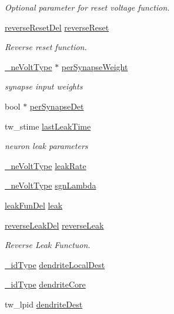 \begin{DoxyCompactItemize}
\begin{DoxyCompactList}\small\item\em Optional parameter for reset voltage function. \end{DoxyCompactList}\item 
\hyperlink{neuron__model_8h_aa939c0acc5b3367975f2f0cb7bc36d17}{reverse\+Reset\+Del} \hyperlink{structneuron_state_abf6970098695585c81e101b2a741b9a5}{reverse\+Reset}
\begin{DoxyCompactList}\small\item\em Reverse reset function. \end{DoxyCompactList}\item 
\hyperlink{mappings_8c_a368ddcd71f7b61cb0f918f22d07ce999}{\+\_\+ne\+Volt\+Type} $\ast$ \hyperlink{structneuron_state_ac21457aec3f29f9f28b58dd95e3d6fb2}{per\+Synapse\+Weight}
\begin{DoxyCompactList}\small\item\em synapse input weights \end{DoxyCompactList}\item 
bool $\ast$ \hyperlink{structneuron_state_a95688135a244a3ce3b35698a49d0da18}{per\+Synapse\+Det}
\item 
tw\+\_\+stime \hyperlink{structneuron_state_a6f4e4d8fc1cf0257b486e01f628d2656}{last\+Leak\+Time}
\begin{DoxyCompactList}\small\item\em neuron leak parameters \end{DoxyCompactList}\item 
\hyperlink{mappings_8c_a368ddcd71f7b61cb0f918f22d07ce999}{\+\_\+ne\+Volt\+Type} \hyperlink{structneuron_state_afe8da12a0fe0aef0987e785a64619706}{leak\+Rate}
\item 
\hyperlink{mappings_8c_a368ddcd71f7b61cb0f918f22d07ce999}{\+\_\+ne\+Volt\+Type} \hyperlink{structneuron_state_a15348eb48eb71000bf4309a776d39cfe}{sgn\+Lambda}
\item 
\hyperlink{structleak_fun_del}{leak\+Fun\+Del} \hyperlink{structneuron_state_ad0271f69fc01192f4f85b74d9bee06de}{leak}
\item 
\hyperlink{structreverse_leak_del}{reverse\+Leak\+Del} \hyperlink{structneuron_state_a0f71d6ac3efc9d397adfcc72c7fe40c1}{reverse\+Leak}
\begin{DoxyCompactList}\small\item\em Reverse Leak Functuon. \end{DoxyCompactList}\item 
\hyperlink{mappings_8c_adc0d1d400308f82e4d42245c2fd946b9}{\+\_\+id\+Type} \hyperlink{structneuron_state_af66b578d3c4aac7db55b573b880db0eb}{dendrite\+Local\+Dest}
\item 
\hyperlink{mappings_8c_adc0d1d400308f82e4d42245c2fd946b9}{\+\_\+id\+Type} \hyperlink{structneuron_state_ab49277e7f9460fbd698aefa5a44b1b0b}{dendrite\+Core}
\item 
tw\+\_\+lpid \hyperlink{structneuron_state_a081d21dd7333cf48eaec21f5eaef8847}{dendrite\+Dest}
\end{DoxyCompactItemize}


